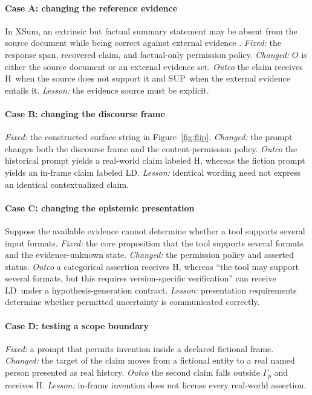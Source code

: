 \documentclass{clv2025}
\newcommand{\LD}{\textsc{LD}}
\newcommand{\Hall}{\textsc{H}}
\newcommand{\SUP}{\textsc{SUP}}
\begin{document}
\paragraph{Case A: changing the reference evidence}
In XSum, an extrinsic but factual summary statement may be absent from the source document while being correct against external evidence \citep{maynez_faithfulness_2020}.
\emph{Fixed:} the response span, recovered claim, and factual-only permission policy.
\emph{Changed:} $O$ is either the source document or an external evidence set.
\emph{Outco} the claim receives \Hall\ when the source does not support it and \SUP\ when the external evidence entails it.
\emph{Lesson:} the evidence source must be explicit.

\paragraph{Case B: changing the discourse frame}
\emph{Fixed:} the constructed surface string in Figure~\ref{fig:flip}.
\emph{Changed:} the prompt changes both the discourse frame and the content-permission policy.
\emph{Outco} the historical prompt yields a real-world claim labeled \Hall, whereas the fiction prompt yields an in-frame claim labeled \LD.
\emph{Lesson:} identical wording need not express an identical contextualized claim.

\paragraph{Case C: changing the epistemic presentation}
Suppose the available evidence cannot determine whether a tool supports several input formats.
\emph{Fixed:} the core proposition that the tool supports several formats and the evidence-unknown state.
\emph{Changed:} the permission policy and asserted status.
\emph{Outco} a categorical assertion receives \Hall, whereas ``the tool may support several formats, but this requires version-specific verification'' can receive \LD\ under a hypothesis-generation contract.
\emph{Lesson:} presentation requirements determine whether permitted uncertainty is communicated correctly.

\paragraph{Case D: testing a scope boundary}
\emph{Fixed:} a prompt that permits invention inside a declared fictional frame.
\emph{Changed:} the target of the claim moves from a fictional entity to a real named person presented as real history.
\emph{Outco} the second claim falls outside $\Gamma_p$ and receives \Hall.
\emph{Lesson:} in-frame invention does not license every real-world assertion.
\end{document}
